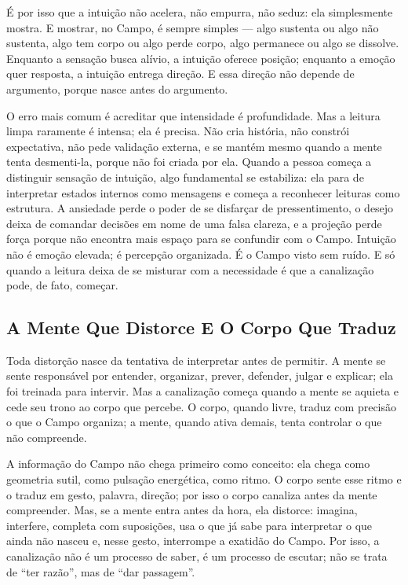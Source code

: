 \documentclass[12pt]{book}
\begin{document}
É por isso que a intuição não acelera, não empurra, não seduz: ela simplesmente mostra. E mostrar, no Campo, é sempre simples --- algo sustenta ou algo não sustenta, algo tem corpo ou algo perde corpo, algo permanece ou algo se dissolve. Enquanto a sensação busca alívio, a intuição oferece posição; enquanto a emoção quer resposta, a intuição entrega direção. E essa direção não depende de argumento, porque nasce antes do argumento.

O erro mais comum é acreditar que intensidade é profundidade. Mas a leitura limpa raramente é intensa; ela é precisa. Não cria história, não constrói expectativa, não pede validação externa, e se mantém mesmo quando a mente tenta desmenti-la, porque não foi criada por ela. Quando a pessoa começa a distinguir sensação de intuição, algo fundamental se estabiliza: ela para de interpretar estados internos como mensagens e começa a reconhecer leituras como estrutura. A ansiedade perde o poder de se disfarçar de pressentimento, o desejo deixa de comandar decisões em nome de uma falsa clareza, e a projeção perde força porque não encontra mais espaço para se confundir com o Campo. Intuição não é emoção elevada; é percepção organizada. É o Campo visto sem ruído. E só quando a leitura deixa de se misturar com a necessidade é que a canalização pode, de fato, começar.

\subsection*{A Mente Que Distorce E O Corpo Que Traduz}

Toda distorção nasce da tentativa de interpretar antes de permitir. A mente se sente responsável por entender, organizar, prever, defender, julgar e explicar; ela foi treinada para intervir. Mas a canalização começa quando a mente se aquieta e cede seu trono ao corpo que percebe. O corpo, quando livre, traduz com precisão o que o Campo organiza; a mente, quando ativa demais, tenta controlar o que não compreende.

A informação do Campo não chega primeiro como conceito: ela chega como geometria sutil, como pulsação energética, como ritmo. O corpo sente esse ritmo e o traduz em gesto, palavra, direção; por isso o corpo canaliza antes da mente compreender. Mas, se a mente entra antes da hora, ela distorce: imagina, interfere, completa com suposições, usa o que já sabe para interpretar o que ainda não nasceu e, nesse gesto, interrompe a exatidão do Campo. Por isso, a canalização não é um processo de saber, é um processo de escutar; não se trata de ``ter razão'', mas de ``dar passagem''.
\end{document}
